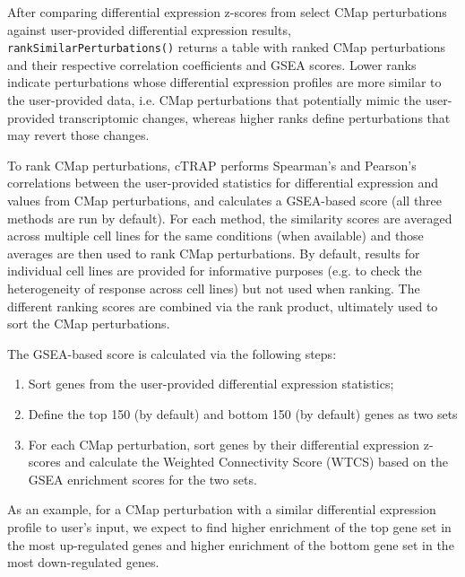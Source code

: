 After comparing differential expression z-scores from select CMap perturbations against user-provided differential expression results, \texttt{rankSimilarPerturbations()} returns a table with ranked CMap perturbations and their respective correlation coefficients and GSEA scores. Lower ranks indicate perturbations whose differential expression profiles are more similar to the user-provided data, i.e. CMap perturbations that potentially mimic the user-provided transcriptomic changes, whereas higher ranks define perturbations that may revert those changes.

To rank CMap perturbations, cTRAP performs Spearman's and Pearson's correlations between the user-provided statistics for differential expression and values from CMap perturbations, and calculates a GSEA-based score (all three methods are run by default). For each method, the similarity scores are averaged across multiple cell lines for the same conditions (when available) and those averages are then used to rank CMap perturbations. By default, results for individual cell lines are provided for informative purposes (e.g. to check the heterogeneity of response across cell lines) but not used when ranking. The different ranking scores are combined via the rank product, ultimately used to sort the CMap perturbations. %

The GSEA-based score is calculated via the following steps:

\begin{enumerate}
	\item Sort genes from the user-provided differential expression statistics;
	\item Define the top 150 (by default) and bottom 150 (by default) genes as two sets
	\item For each CMap perturbation, sort genes by their differential expression z-scores and calculate the Weighted Connectivity Score (WTCS) \cite{subramanian:2017ul} based on the GSEA enrichment scores for the two sets.
\end{enumerate}

As an example, for a CMap perturbation with a similar differential expression profile to user’s input, we expect to find higher enrichment of the top gene set in the most up-regulated genes and higher enrichment of the bottom gene set in the most down-regulated genes.

